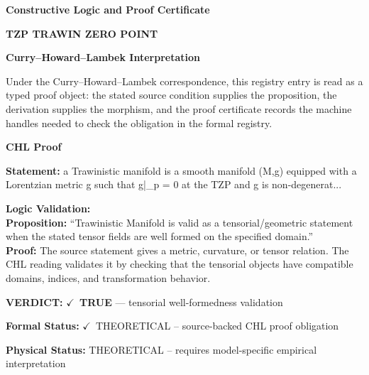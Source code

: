 \clearpage
\begingroup\tzpsupportsetup
\noindent\textbf{\fontsize{10.8pt}{12.8pt}\selectfont [ID 0001] Constructive Logic and Proof Certificate}\par
\noindent\textbf{\fontsize{10pt}{12pt}\selectfont TZP TRAWIN ZERO POINT}\par
\vspace{0.45em}
\begingroup
\footnotesize
\setlength{\parskip}{0.22em}
\setlength{\parindent}{0pt}
\noindent\textbf{Curry--Howard--Lambek Interpretation}\par
Under the Curry--Howard--Lambek correspondence, this registry entry is read as a typed proof
object: the stated source condition supplies the proposition, the derivation supplies the
morphism, and the proof certificate records the machine handles needed to check the obligation
in the formal registry.

\vspace{0.45em}
\noindent\textbf{CHL Proof}\par
\textbf{Statement:} a Trawinistic manifold is a smooth manifold (M,g) equipped with a Lorentzian metric
g such that  g|\_p = 0 at the TZP and g is non-degenerat...

\textbf{Logic Validation:}\\
\textbf{Proposition:} ``Trawinistic Manifold is valid as a tensorial/geometric statement when the stated tensor
fields are well formed on the specified domain.''\\
\textbf{Proof:} The source statement gives a metric, curvature, or tensor relation. The CHL reading
validates it by checking that the tensorial objects have compatible domains, indices,
and transformation behavior.

\textbf{VERDICT:} \ensuremath{\checkmark}\ \textbf{TRUE} --- tensorial well-formedness validation

\textbf{Formal Status:} \ensuremath{\checkmark}\ THEORETICAL -- source-backed CHL proof obligation

\textbf{Physical Status:} THEORETICAL -- requires model-specific empirical interpretation
\par\vspace{0.45em}
\par
\ifTZPDarkEdition
{}
\fi
\endgroup
\endgroup
